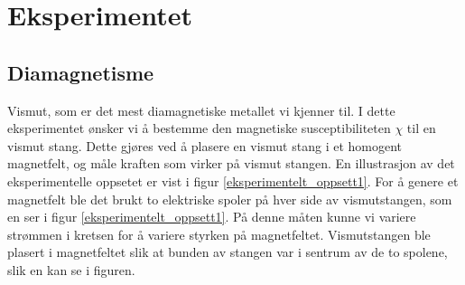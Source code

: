 \documentclass[%
 reprint,
 amsmath,amssymb,
 aps,
]{revtex4-1}
\begin{document}
\section{\label{sec:level3}Eksperimentet}
\subsection{Diamagnetisme}
Vismut, som er det mest diamagnetiske metallet vi kjenner til. I dette eksperimentet ønsker vi å bestemme den magnetiske susceptibiliteten $\chi$ til en vismut stang. Dette gjøres ved å plasere en vismut stang i et homogent magnetfelt, og måle kraften som virker på vismut stangen. En illustrasjon av det eksperimentelle oppsetet er vist i figur \vref{eksperimentelt_oppsett1}. For å genere et magnetfelt ble det brukt to elektriske spoler på hver side av vismutstangen, som en ser i figur \vref{eksperimentelt_oppsett1}. På denne måten kunne vi variere strømmen i kretsen for å variere styrken på magnetfeltet. Vismutstangen ble plasert i magnetfeltet slik at bunden av stangen var i sentrum av de to spolene, slik en kan se i figuren.
\end{document}
